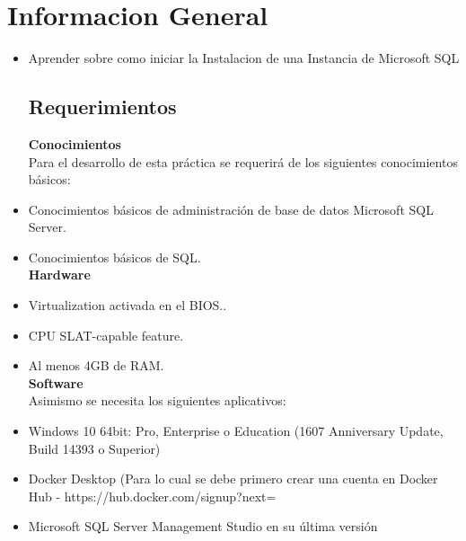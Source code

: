 \section{Informacion General} 

\begin{itemize}
\subsection{Objetivos:}

	 \item Aprender sobre como iniciar la Instalacion  de una Instancia de Microsoft SQL
\subsection{Requerimientos}

	
	\textbf{Conocimientos}\\
	 
	
    Para el desarrollo de esta práctica se requerirá de los siguientes        	  conocimientos básicos:
	\item Conocimientos básicos de administración de base de datos 	  			 Microsoft SQL Server.
	\item Conocimientos básicos de SQL.\\
	
	
\textbf{Hardware}\\
	
	\item Virtualization activada en el BIOS..
	\item CPU SLAT-capable feature.
	\item Al menos 4GB de RAM.\\
	
	 \textbf{Software}\\
	
	Asimismo se necesita los siguientes aplicativos:
	\item Windows 10 64bit: Pro, Enterprise o Education (1607 Anniversary 			  Update, Build 14393 o Superior)
	\item Docker Desktop (Para lo cual se debe primero crear una cuenta en 			  Docker Hub - https://hub.docker.com/signup?next=%
	\item Microsoft SQL Server Management Studio en su última versión



\end{itemize}